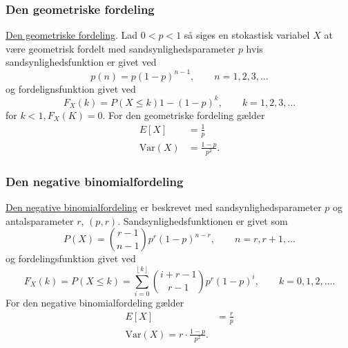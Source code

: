 \subsubsection{Den geometriske fordeling}
\underline{\hyperref[afs:forgeo]{Den geometriske fordeling}}. Lad $0 < p < 1$ så siges en stokastisk variabel $X$ at være geometrisk fordelt med sandsynlighedsparameter $p$ hvis sandsynlighedsfunktion er givet ved
\[ 
p(n) = p(1-p)^{n-1}, \qquad n = 1,2,3,\ldots 
\]
og fordelignsfunktion givet ved
\[ 
F_X(k) = P(X \leq k) 1 - (1-p)^{k}, \qquad k = 1, 2, 3, \ldots 
\]
for $k < 1, F_X(K) = 0$.
For den geometriske fordeling gælder
\begin{align*}
  E[X] &= \frac{1}{p} \\
  \mathrm{Var}(X) &= \frac{1-p}{p^2}
.\end{align*}



\subsubsection{Den negative binomialfordeling}
\underline{\hyperref[afs:fornegbin]{Den negative binomialfordeling}} er beskrevet med sandsynlighedsparameter $p$ og antalsparameter $r$, $(p,r)$. Sandsynlighedsfunktionen er givet som
\[ 
P(X) = \binom{r-1}{n-1}p^{r}(1-p)^{n-r}, \qquad n = r, r+1, \ldots 
\]
og fordelingsfunktion givet ved
\[ 
F_X(k) = P(X \leq k) = \sum_{i = 0}^{\left\lfloor k \right\rfloor} \binom{i + r -1}{r - 1}p^{r}(1-p)^{i}, \qquad k = 0, 1, 2, \ldots 
.\]
For den negative binomialfordeling gælder
\begin{align*}
  E[X] &= \frac{r}{p} \\
  \mathrm{Var}(X) = r \cdot \frac{1-p}{p^2}
.\end{align*}


